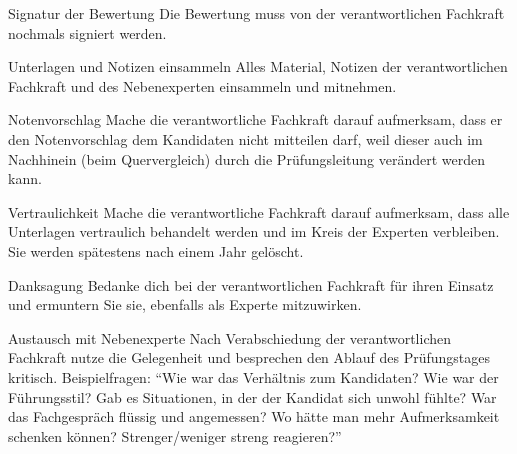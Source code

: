 \begin{taskitemwithoutcomment}{Signatur der Bewertung}
  Die Bewertung muss von der verantwortlichen Fachkraft nochmals signiert werden.
\end{taskitemwithoutcomment}
\begin{taskitemwithoutcomment}{Unterlagen und Notizen einsammeln}
  Alles Material, Notizen der verantwortlichen Fachkraft und des Nebenexperten einsammeln und mitnehmen.
\end{taskitemwithoutcomment}
\begin{taskitemwithoutcomment}{Notenvorschlag}
  Mache die verantwortliche Fachkraft darauf aufmerksam, dass er den Notenvorschlag dem Kandidaten nicht mitteilen darf, weil dieser auch im Nachhinein (beim Quervergleich) durch die Prüfungsleitung verändert werden kann.
\end{taskitemwithoutcomment}
\begin{taskitemwithoutcomment}{Vertraulichkeit}
  Mache die verantwortliche Fachkraft darauf aufmerksam, dass alle Unterlagen vertraulich behandelt werden und im Kreis der Experten verbleiben. Sie werden spätestens nach einem Jahr gelöscht.
\end{taskitemwithoutcomment}
\begin{taskitemwithoutcomment}{Danksagung}
  Bedanke dich bei der verantwortlichen Fachkraft für ihren Einsatz und ermuntern Sie sie, ebenfalls als Experte mitzuwirken.
\end{taskitemwithoutcomment}
\begin{taskitem}{Austausch mit Nebenexperte}
  Nach Verabschiedung der verantwortlichen Fachkraft nutze die Gelegenheit und besprechen den Ablauf des Prüfungstages kritisch. Beispielfragen: \enquote{Wie war das Verhältnis zum Kandidaten? Wie war der Führungsstil? Gab es Situationen, in der der Kandidat sich unwohl fühlte? War das Fachgespräch flüssig und angemessen? Wo hätte man mehr Aufmerksamkeit schenken können? Strenger/weniger streng reagieren?}
\end{taskitem}